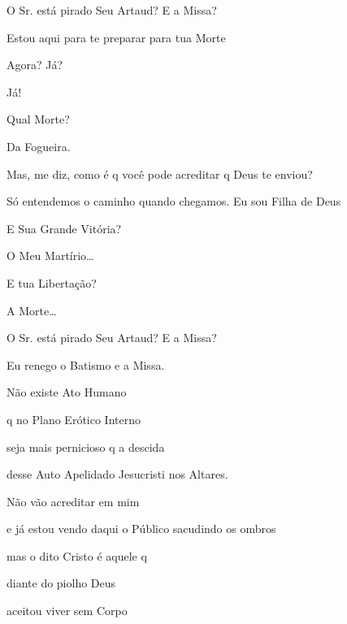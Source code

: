 

O Sr. está pirado Seu Artaud? E a Missa?


Estou aqui para te preparar para tua Morte


Agora? Já?


Já!


Qual Morte?


Da Fogueira.

Mas, me diz, como é q você pode acreditar q Deus te enviou?


Só entendemos o caminho quando chegamos. Eu sou Filha de Deus


E Sua Grande Vitória?


O Meu Martírio\ldots{}


E tua Libertação?


A Morte\ldots{}




O Sr. está pirado Seu Artaud? E a Missa?


Eu renego o Batismo e a Missa.

Não existe Ato Humano 

q no Plano Erótico Interno

seja mais pernicioso q a descida

desse Auto Apelidado Jesucristi nos Altares.

Não vão acreditar em mim

e já estou vendo daqui o Público sacudindo os ombros

mas o dito Cristo é aquele q

diante do piolho Deus

aceitou viver sem Corpo

